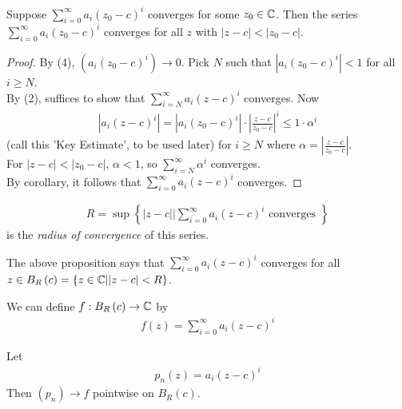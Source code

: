 \documentclass[a4paper]{article}
\begin{document}
\begin{prop}
Suppose $\sum_{i=0}^\infty a_i\left(z_0-c\right)^i$ converges for some $z_0 \in \mathbb{C}$. Then the series $\sum_{i=0}^\infty a_i\left(z_0-c\right)^i$ converges for all $z$ with $|z-c| < |z_0 - c|$.
\begin{proof}
By (4), $\left(a_i\left(z_0-c\right)^i\right) \to 0$. Pick $N$ such that $|a_i\left(z_0-c\right)^i| < 1$ for all $i \geq N$.\\
By (2), suffices to show that $\sum_{i=N}^\infty a_i\left(z-c\right)^i$ converges. Now
\begin{equation*}
\begin{aligned}
|a_i\left(z-c\right)^i| = |a_i\left(z_0-c\right)^i | \cdot \left|\frac{z-c}{z_0-c}\right|^i \leq 1\cdot \alpha^i
\end{aligned}
\end{equation*}
(call this 'Key Estimate', to be used later) for $i \geq N$ where $\alpha = \left|\frac{z-c}{z_0-c}\right|$.\\
For $|z-c| < |z_0-c|$, $\alpha<1$, so $\sum_{i=N}^\infty \alpha^i$ converges.\\
By corollary, it follows that $\sum_{i=0}^\infty a_i\left(z-c\right)^i$ converges.
\end{proof}
\end{prop}

\begin{defi}
\begin{equation*}
\begin{aligned}
R=\sup\left\{|z-c| |\sum_{i=0}^\infty a_i\left(z-c\right)^i\text{ converges }\right\}
\end{aligned}
\end{equation*}
is the \emph{radius of convergence} of this series.
\end{defi}
The above proposition says that $\sum_{i=0}^\infty a_i\left(z-c\right)^i$ converges for all $z \in B_R\left(c\right) = \left\{z \in \mathbb{C} | |z-c|<R\right\}$.

We can define $f:B_R \left(c\right) \to \mathbb{C}$ by
\begin{equation*}
\begin{aligned}
f\left(z\right) = \sum_{i=0}^\infty a_i\left(z-c\right)^i
\end{aligned}
\end{equation*}

Let
\begin{equation*}
\begin{aligned}
p_n\left(z\right) = a_i\left(z-c\right)^i
\end{aligned}
\end{equation*}
Then $\left(p_n\right) \to f$ pointwise on $B_R\left(c\right)$.
\end{document}
